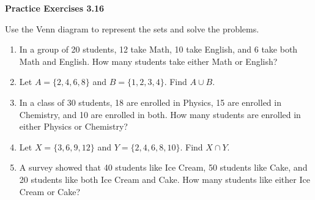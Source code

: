 \vspace{0.3ex}
\noindent\textbf{Practice Exercises 3.16}

\vspace{0.2ex}

Use the Venn diagram to represent the sets and solve the problems.

\begin{enumerate}[label=\color{blue}\arabic*.]
    \item In a group of 20 students, 12 take Math, 10 take English, and 6 take both Math and English. How many students take either Math or English?
    \item Let \( A = \{2, 4, 6, 8\} \) and \( B = \{1, 2, 3, 4\} \). Find \( A \cup B \).
    \item In a class of 30 students, 18 are enrolled in Physics, 15 are enrolled in Chemistry, and 10 are enrolled in both. How many students are enrolled in either Physics or Chemistry?
    \item Let \( X = \{3, 6, 9, 12\} \) and \( Y = \{2, 4, 6, 8, 10\} \). Find \( X \cap Y \).
    \item A survey showed that 40 students like Ice Cream, 50 students like Cake, and 20 students like both Ice Cream and Cake. How many students like either Ice Cream or Cake?
\end{enumerate}
